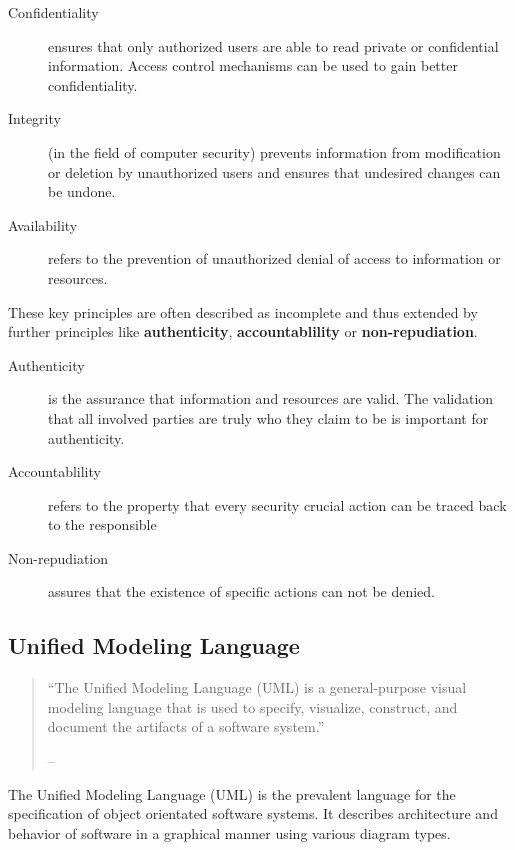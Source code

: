 \documentclass{acmtog} %
\begin{document}
\begin{description}
	\item[Confidentiality]
		ensures that only authorized users are able to read private or confidential information.
		Access control mechanisms can be used to gain better confidentiality.
	\item[Integrity]
		(in the field of computer security) prevents information from modification or deletion by unauthorized users and ensures that undesired changes can be undone.
	\item[Availability]
		refers to the prevention of unauthorized denial of access to information or resources.
\end{description}

These key principles are often described as incomplete and thus extended by further principles like \textbf{authenticity}, \textbf{accountablility} or \textbf{non-repudiation}.

\begin{description}
	\item[Authenticity] is the assurance that information and resources are valid.
		The validation that all involved parties are truly who they claim to be is important for authenticity.
	\item[Accountablility]
		refers to the property that every security crucial action can be traced back to the responsible
	\item[Non-repudiation]
		assures that the existence of specific actions can not be denied.
\end{description}

\subsection{Unified Modeling Language}

\begin{quote}
	``The Unified Modeling Language (UML) is a general-purpose visual modeling language that is used to specify, visualize, construct, and document the artifacts of a software system.''

	\hfill -- \cite[Chapter 1]{BJR99}
\end{quote}

The Unified Modeling Language (UML) is the prevalent language for the specification of object orientated software systems.
It describes architecture and behavior of software in a graphical manner using various diagram types.

\end{document}
